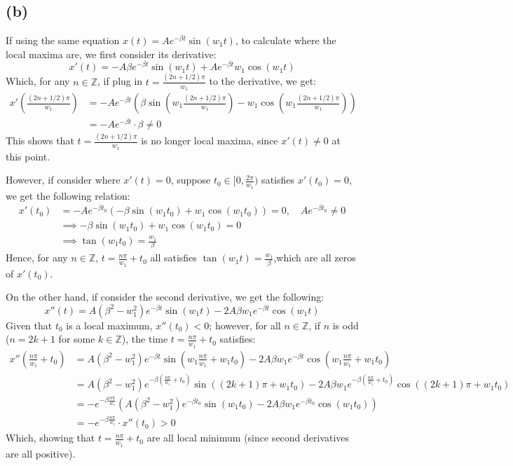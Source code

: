 \documentclass{article}
\newcommand{\ZZ}{\mathbb{Z}}
\begin{document}
\subsection*{(b)}
If using the same equation $x(t)=Ae^{-\beta t}\sin(w_1t)$, to calculate where the local maxima are, we first consider its derivative:
\begin{equation}
    x'(t) = -A\beta e^{-\beta t}\sin(w_1 t)+Ae^{-\beta t}w_1\cos(w_1 t)
\end{equation}
Which, for any $n \in \ZZ$, if plug in $t=\frac{(2n+1/2)\pi}{w_1}$ to the derivative, we get:
\begin{align}
    x'\left(\frac{(2n+1/2)\pi}{w_1}\right) &= -Ae^{-\beta t}\left(\beta\sin\left(w_1\frac{(2n+1/2)\pi}{w_1}\right)-w_1\cos\left(w_1\frac{(2n+1/2)\pi}{w_1}\right)\right)\\
    &= -Ae^{-\beta t}\cdot \beta \neq 0
\end{align}
This shows that $t=\frac{(2n+1/2)\pi}{w_1}$ is no longer local maxima, since $x'(t)\neq 0$ at this point.

\hfil

However, if consider where $x'(t)=0$, suppose $t_0 \in [0,\frac{2\pi}{w_1})$ satisfies $x'(t_0)=0$, we get the following relation:
\begin{align}
    x'(t_0)&=-Ae^{-\beta t_0}(-\beta\sin(w_1 t_0)+w_1\cos(w_1 t_0)) = 0,\quad Ae^{-\beta t_0}\neq 0\\
    &\implies -\beta\sin(w_1 t_0)+w_1\cos(w_1 t_0)=0\\
    &\implies \tan(w_1 t_0)=\frac{w_1}{\beta}
\end{align}
Hence, for any $n \in \ZZ$, $t=\frac{n\pi}{w_1}+t_0$ all satisfies $\tan(w_1 t)=\frac{w_1}{\beta}$,which are all zeros of $x'(t_0)$.

On the other hand, if consider the second derivative, we get the following:
\begin{equation}
    x''(t) = A(\beta^2-w_1^2)e^{-\beta t}\sin(w_1 t)-2A\beta w_1e^{-\beta t}\cos(w_1 t)
\end{equation}
Given that $t_0$ is a local maximum, $x''(t_0)<0$; however, for all $n\in\ZZ$, if $n$ is odd ($n=2k+1$ for some $k\in \ZZ$), the time $t=\frac{n\pi}{w_1}+t_0$ satisfies:
\begin{align}
    x''\left(\frac{n\pi}{w_1}+t_0\right)&=A(\beta^2-w_1^2)e^{-\beta t}\sin\left(w_1\frac{n\pi}{w_1}+w_1t_0\right) - 2A\beta w_1e^{-\beta t}\cos\left(w_1\frac{n\pi}{w_1}+w_1t_0\right)\\
    &= A(\beta^2-w_1^2)e^{-\beta (\frac{n\pi}{w_1}+t_0)}\sin((2k+1)\pi +w_1t_0)-2A\beta w_1e^{-\beta (\frac{n\pi}{w_1}+t_0)}\cos((2k+1)\pi +w_1t_0)\\
    &= -e^{-\beta\frac{n\pi}{w_1}}\left(A(\beta^2-w_1^2)e^{-\beta t_0}\sin(w_1t_0)-2A\beta w_1e^{-\beta t_0}\cos(w_1 t_0)\right)\\
    &= -e^{-\beta \frac{n\pi}{w_1}}\cdot x''(t_0)>0
\end{align}
Which, showing that $t=\frac{n\pi}{w_1}+t_0$ are all local minimum (since second derivatives are all positive). 
\end{document}
